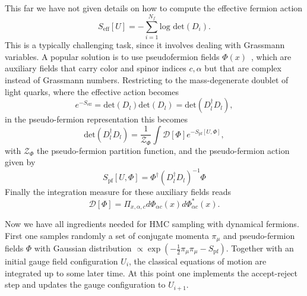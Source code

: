 This far we have not given details on how to compute the effective fermion action
\begin{equation}
S_{\textrm{eff}}[U]=-\sum_{i=1}^{N_f}\textrm{log det}(D_i).
\end{equation}
This is a typically challenging task, since it involves dealing with Grassmann variables. A popular solution is to use pseudofermion fields $\Phi(x)$~\citep{Weingarten:1980hx}, which are auxiliary fields that carry color and spinor indices $c,\alpha$ but that are complex instead of Grassmann numbers. Restricting to the mass-degenerate doublet of light quarks, where the effective action becomes
\begin{equation}
e^{-S_{\textrm{eff}}}=\textrm{det}(D_l)\textrm{det}(D_l)=\textrm{det}(D_l^{\dagger}D_l),
\end{equation}
in the pseudo-fermion representation this becomes
\begin{equation}
\textrm{det}(D_l^{\dagger}D_l)=\frac{1}{\mathcal{Z}_{\Phi}}\int\mathcal{D}[\Phi]e^{-S_{\textrm{pf}}[U,\Phi]},
\end{equation}
with $\mathcal{Z}_{\Phi}$ the pseudo-fermion partition function, and the pseudo-fermion action given by
\begin{equation}
S_{\textrm{pf}}[U,\Phi]=\Phi^{\dagger}\left(D_l^{\dagger}D_l\right)^{-1}\Phi
\end{equation}
Finally the integration measure for these auxiliary fields reads
\begin{equation}
\mathcal{D}[\Phi]=\Pi_{x,\alpha,c}d\Phi_{\alpha c}(x)d\Phi^*_{\alpha c}(x).
\end{equation}

Now we have all ingredients needed for HMC sampling with dynamical fermions. First one samples randomly a set of conjugate momenta $\pi_{\mu}$ and pseudo-fermion fields $\Phi$ with Gaussian distribution $\propto\exp\left(-\frac{1}{2}\pi_{\mu}\pi_{\mu}-S_{\textrm{pf}}\right)$. Together with an initial gauge field configuration $U_{i}$, the classical equations of motion are integrated up to some later time. At this point one implements the accept-reject step and updates the gauge configuration to $U_{i+1}$.

